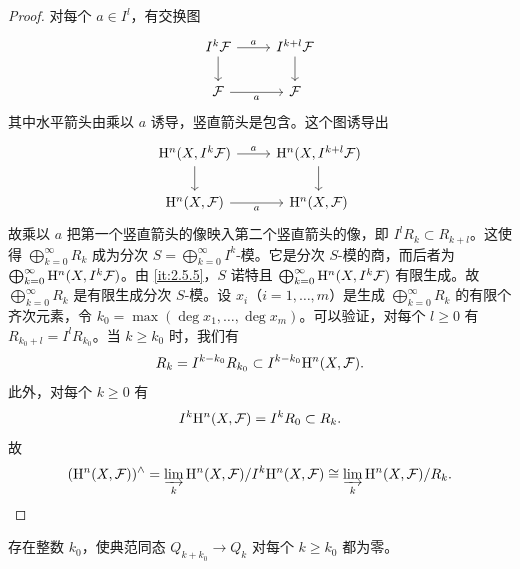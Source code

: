 \begin{proof}
对每个 $a\in I^l$，有交换图
\[
\begin{tikzcd}
I^k\cF \arrow[r,"a"] \arrow[d] & I^{k+l}\cF \arrow[d] \\
\cF \arrow[r,"a"'] & \cF
\end{tikzcd}
\]
其中水平箭头由乘以 $a$ 诱导，竖直箭头是包含。这个图诱导出
\[
\begin{tikzcd}
\HH^n(X,I^k\cF) \arrow[r,"a"] \arrow[d] & \HH^n(X,I^{k+l}\cF) \arrow[d] \\
\HH^n(X,\cF) \arrow[r,"a"'] & \HH^n(X,\cF)
\end{tikzcd}
\]
故乘以 $a$ 把第一个竖直箭头的像映入第二个竖直箭头的像，即 $I^lR_k\subset R_{k+l}$。这使得 $\bigoplus_{k=0}^\infty R_k$ 成为分次 $S=\bigoplus_{k=0}^\infty I^k$-模。它是分次 $S$-模的商，而后者为 $\bigoplus_{k=0}^\infty\mathrm{H}^n(X,I^k\mathcal{F})$。由 \ref{it:2.5.5}，$S$ 诺特且 $\bigoplus_{k=0}^\infty\mathrm{H}^n(X,I^k\mathcal{F})$ 有限生成。故 $\bigoplus_{k=0}^\infty R_k$ 是有限生成分次 $S$-模。设 $x_i$（$i=1,\dots,m$）是生成 $\bigoplus_{k=0}^\infty R_k$ 的有限个齐次元素，令 $k_0=\max(\deg x_1,\dots,\deg x_m)$。可以验证，对每个 $l\ge 0$ 有 $R_{k_0+l}=I^lR_{k_0}$。当 $k\ge k_0$ 时，我们有
\[
R_k=I^{k-k_0}R_{k_0}\subset I^{k-k_0}\mathrm{H}^n(X,\mathcal{F}).
\]
此外，对每个 $k\ge 0$ 有
\[
I^k\mathrm{H}^n(X,\mathcal{F})=I^kR_0\subset R_k.
\]
故
\[
(\mathrm{H}^n(X,\mathcal{F}))^{\wedge}=\varinjlim_k\mathrm{H}^n(X,\mathcal{F})/I^k\mathrm{H}^n(X,\mathcal{F})\cong\varinjlim_k\mathrm{H}^n(X,\mathcal{F})/R_k.
\]
\end{proof}
\begin{lemma}\label{it:2.5.8}
存在整数 $k_0$，使典范同态 $Q_{k+k_0}\to Q_k$ 对每个 $k\ge k_0$ 都为零。
\end{lemma}

